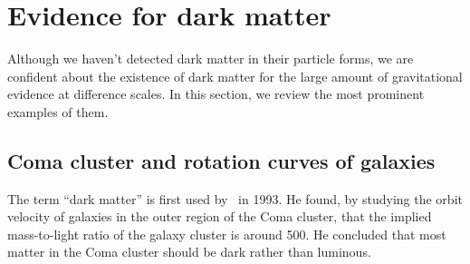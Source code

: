 \documentclass[doublespace,nopageskip]{VTthesis} %
\begin{document}


\section{Evidence for dark matter} \label{se:one_section}

Although we haven't detected dark matter in their particle forms, we are confident about the existence of dark matter for the large amount of gravitational evidence at difference scales. In this section, we review the most prominent examples of them.

\subsection{Coma cluster and rotation curves of galaxies} \label{sse:rotation_curve}

The term ``dark matter'' is first used by~\citet{1933AcHPh...6..110Z} in 1993. He found, by studying the orbit velocity of galaxies in the outer region of the Coma cluster, that the implied mass-to-light ratio of the galaxy cluster is around 500. He concluded that most matter in the Coma cluster should be dark rather than luminous.
\end{document}
